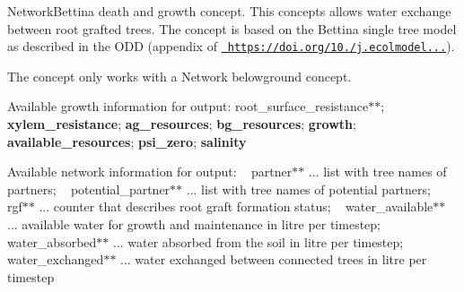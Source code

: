 Network\+Bettina death and growth concept. This concepts allows water exchange between root grafted trees. The concept is based on the Bettina single tree model as described in the ODD (appendix of \href{https://doi.org/10.1016/j.ecolmodel.2018.10.005}{\texttt{ https\+://doi.\+org/10./j.\+ecolmodel...}}).

The concept only works with a Network belowground concept.

Available growth information for output\+: root\+\_\+surface\+\_\+resistance$\ast$$\ast$; {\bfseries{xylem\+\_\+resistance}}; {\bfseries{ag\+\_\+resources}}; {\bfseries{bg\+\_\+resources}}; {\bfseries{growth}}; {\bfseries{available\+\_\+resources}}; {\bfseries{psi\+\_\+zero}}; {\bfseries{salinity}}

Available network information for output\+: ~\newline
 partner$\ast$$\ast$ ... list with tree names of partners; ~\newline
 potential\+\_\+partner$\ast$$\ast$ ... list with tree names of potential partners; ~\newline
 rgf$\ast$$\ast$ ... counter that describes root graft formation status; ~\newline
 water\+\_\+available$\ast$$\ast$ ... available water for growth and maintenance in litre per timestep; ~\newline
 water\+\_\+absorbed$\ast$$\ast$ ... water absorbed from the soil in litre per timestep; ~\newline
 water\+\_\+exchanged$\ast$$\ast$ ... water exchanged between connected trees in litre per timestep 